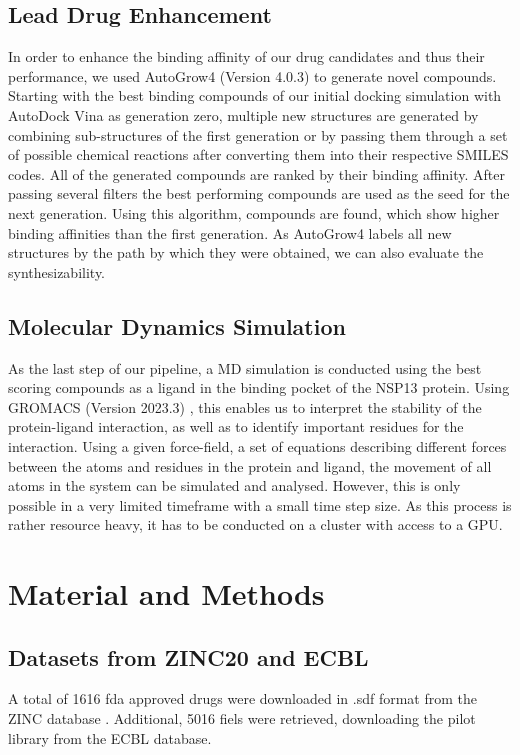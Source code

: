 \documentclass[11pt, letterpaper, titlepage]{article}
\renewcommand{\cite}{\parencite}
\begin{document}
\subsection{Lead Drug Enhancement}
In order to enhance the binding affinity of our drug candidates and thus their performance, we used AutoGrow4 (Version 4.0.3) \cite{packageAutogrow4} to generate novel compounds. Starting with the best binding compounds of our initial docking simulation with AutoDock Vina as generation zero, multiple new structures are generated by combining sub-structures of the first generation or by passing them through a set of possible chemical reactions after converting them into their respective SMILES codes. All of the generated compounds are ranked by their binding affinity. After passing several filters the best performing compounds are used as the seed for the next generation. Using this algorithm, compounds are found, which show higher binding affinities than the first generation. As AutoGrow4 labels all new structures by the path by which they were obtained, we can also evaluate the synthesizability.  

\subsection{Molecular Dynamics Simulation}
As the last step of our pipeline, a MD simulation is conducted using the best scoring compounds as a ligand in the binding pocket of the NSP13 protein. Using GROMACS (Version 2023.3) \cite{packageGROMACS}, this enables us to interpret the stability of the protein-ligand interaction, as well as to identify important residues for the interaction. Using a given force-field, a set of equations describing different forces between the atoms and residues in the protein and ligand, the movement of all atoms in the system can be simulated and analysed. However, this is only possible in a very limited timeframe with a small time step size. As this process is rather resource heavy, it has to be conducted on a cluster with access to a GPU. 


\section{Material and Methods}
\subsection{Datasets from ZINC20 and ECBL}
A total of 1616 fda approved drugs were downloaded in .sdf format from the ZINC database \cite{Irwin.2020}. Additional, 5016 fiels were retrieved, downloading the pilot library from the ECBL database.
\end{document}
